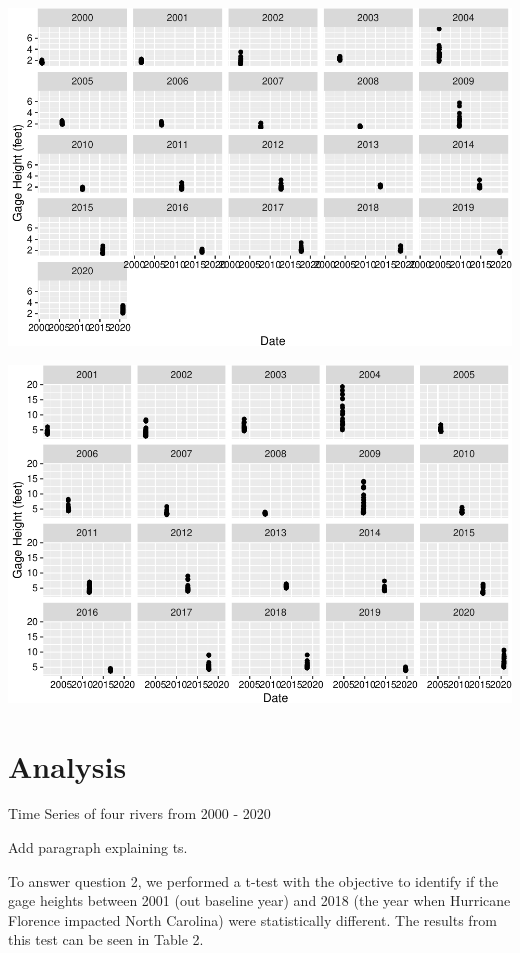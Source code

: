 \documentclass[
  12pt,
]{article}
\begin{document}
\includegraphics{Project_Template_files/figure-latex/Plot2-1.pdf}

\includegraphics{Project_Template_files/figure-latex/Plot3-1.pdf}

\newpage

\hypertarget{analysis}{%
\section{Analysis}\label{analysis}}

Time Series of four rivers from 2000 - 2020

Add paragraph explaining ts.

To answer question 2, we performed a t-test with the objective to
identify if the gage heights between 2001 (out baseline year) and 2018
(the year when Hurricane Florence impacted North Carolina) were
statistically different. The results from this test can be seen in Table
2.
\end{document}
